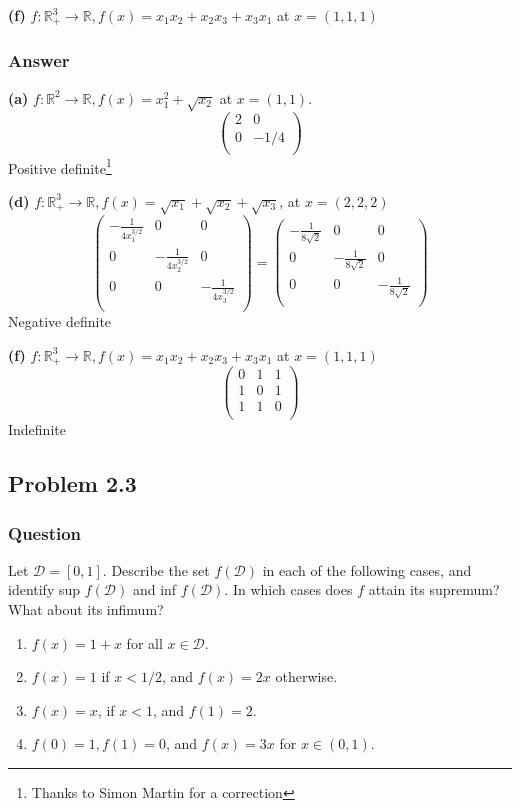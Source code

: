 \documentclass[12pt]{article}
\begin{document}
\textbf{(f)} $f: \mathbb{R}^3_+ \to \mathbb{R}, f(x) = x_1x_2+ x_2 x_3+ x_3x_1$ at $x=(1,1,1)$
\subsubsection{Answer}

\textbf{(a)} $f:\mathbb{R}^2 \to \mathbb{R}, f(x) = x_1^2 + \sqrt{x_2}$ at $x = (1,1)$.
\[\left(
\begin{array}{lr}
2 & 0 \\
0 & -1/4 \\
\end{array}
\right)
\]
Positive definite\footnote{Thanks to Simon Martin for a correction}

\textbf{(d)} $f:\mathbb{R}^3_+ \to \mathbb{R}, f(x) = \sqrt{x_1}+\sqrt{x_2}+\sqrt{x_3}$, at $x=(2,2,2)$
\[\left(
\begin{array}{lcr}
-\frac{1}{4 x_1^{3/2}} & 0& 0 \\
0& -\frac{1}{4 x_2^{3/2}} & 0 \\
0 & 0& -\frac{1}{4 x_3^{3/2}} \\
\end{array}
\right)
=
\left(
\begin{array}{lcr}
-\frac{1}{8 \sqrt{2}} & 0& 0 \\
0& -\frac{1}{8 \sqrt{2}} & 0 \\
0 & 0& -\frac{1}{8 \sqrt{2}}\\
\end{array}
\right)
\]
Negative definite

\textbf{(f)} $f: \mathbb{R}^3_+ \to \mathbb{R}, f(x) = x_1x_2+ x_2 x_3+ x_3x_1$ at $x=(1,1,1)$
\[\left(
\begin{array}{lcr}
0 & 1& 1 \\
1 & 0& 1 \\
1 & 1& 0 \\
\end{array}
\right)\]
Indefinite

\subsection{Problem 2.3}
\subsubsection{Question}
Let $\mathcal{D} = [0,1]$. Describe the set $f(\mathcal{D})$ in each of the following cases, and identify sup $f(\mathcal{D})$ and inf $f(\mathcal{D})$. In which cases does $f$ attain its supremum? What about its infimum?
\begin{enumerate}
\item $f(x)=1+x$ for all $x \in \mathcal{D}$.
\item $f(x) = 1$ if $x<1/2$, and $f(x)=2x$ otherwise.
\item $f(x) = x$, if $x<1$, and $f(1) =2$.
\item $f(0) = 1, f(1)=0$, and $f(x) =3x$ for $x \in (0,1)$.
\end{enumerate}
\end{document}
